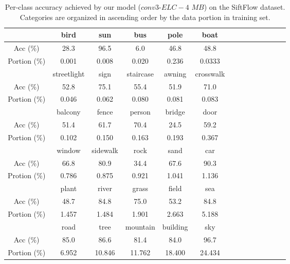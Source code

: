 \documentclass[10pt,twocolumn,letterpaper]{article}
\begin{document}
\begin{table*}
\begin{center}
\label{table:acs}
\begin{tabular}{c|c|c|c|c|c|c|c|c|c|c|c|c|c}
\hline \hline

\rowcolor{Gray}
& bird  & sun & bus & pole & boat  \\
\hline
Acc (\%) & 28.3 & 96.5 & 6.0 & 46.8 & 48.8  \\
\hline
Portion (\%) & 0.001 & 0.008 & 0.020 & 0.236 & 0.0333  \\

\hline \hline
\rowcolor{Gray}
& streetlight & sign & staircase & awning & crosswalk\\
\hline
Acc (\%) & 52.8 & 75.1 & 55.4 & 51.9 & 71.0 \\
\hline
Portion (\%)  & 0.046 & 0.062 & 0.080 & 0.081 & 0.083  \\

\hline \hline
\rowcolor{Gray}
& balcony & fence & person & bridge & door  \\
\hline
Acc (\%) & 51.4 & 61.7 & 70.4 & 24.5 & 59.2 \\
\hline
Portion (\%) & 0.102 & 0.150 & 0.163 & 0.193 & 0.367  \\

\hline \hline
\rowcolor{Gray}
& window & sidewalk & rock & sand & car\\
\hline
Acc (\%) & 66.8 & 80.9 & 34.4 & 67.6 & 90.3 \\
\hline
Protion (\%)  & 0.786 & 0.875 & 0.921 & 1.041 & 1.136 \\

\hline \hline
\rowcolor{Gray}
& plant & river & grass & field & sea \\
\hline
Acc (\%) & 48.7 & 84.8 & 75.0 & 53.2 & 84.8 \\
\hline
Portion (\%) & 1.457 & 1.484 & 1.901 & 2.663 & 5.188  \\

\hline \hline
\rowcolor{Gray}
& road & tree & mountain & building & sky\\

\hline
Acc (\%) & 85.0 & 86.6 & 81.4 & 84.0 & 96.7 \\
\hline
Portion (\%)  & 6.952 & 10.846 & 11.762 & 18.400 & 24.434\\

\end{tabular}
\end{center}
\caption{Per-class accuracy achieved by our model ($conv3$-$ELC-4$ $MB$) on the SiftFlow dataset. Categories are organized in ascending order by the data portion in training set.}
\label{per_class_siftflow}
\end{table*}
\end{document}

